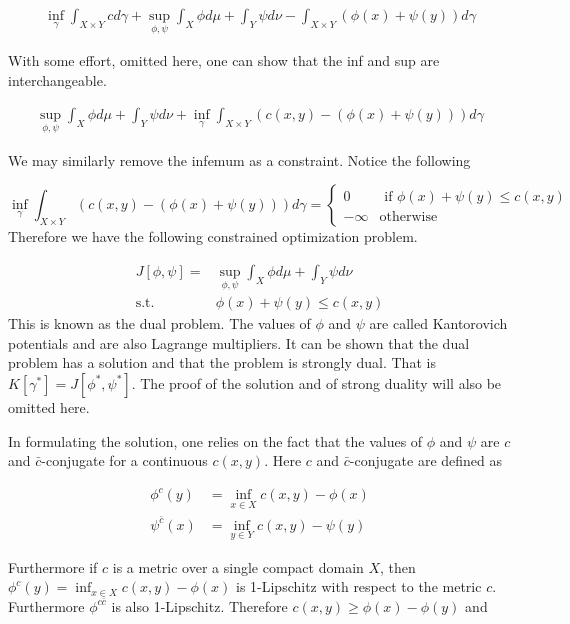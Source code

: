 \documentclass[12pt]{article}
\begin{document}
\begin{align*}
\inf_\gamma \int_{X\times Y} cd\gamma +\sup_{\phi,\psi} \int_X\phi d\mu + \int_Y\psi d\nu - \int_{X\times Y} \left(\phi(x)+\psi(y)\right)d\gamma
\end{align*}

\noindent
With some effort, omitted here, one can show that the inf and sup are interchangeable.

\begin{align*}
\sup_{\phi,\psi} \int_X\phi d\mu + \int_Y\psi d\nu + \inf_\gamma \int_{X\times Y} (c(x,y)-\left(\phi(x)+\psi(y)\right))d\gamma
\end{align*}

\noindent
We may similarly remove the infemum as a constraint. Notice the following

$$\inf_\gamma \int_{X\times Y} (c(x,y)-\left(\phi(x)+\psi(y)\right))d\gamma = \begin{cases} 0 & \text{ if } \phi(x)+\psi(y)\leq c(x,y)\\ -\infty & \text{otherwise} \end{cases}$$
\noindent
Therefore we have the following constrained optimization problem.

\begin{align*}
J[\phi,\psi]=&\sup_{\phi,\psi} \int_X\phi d\mu+\int_Y\psi d\nu \\
\text{s.t.} \quad & \phi(x)+\psi(y)\leq c(x,y)
\end{align*}
\noindent
This is known as the dual problem. The values of $\phi$ and $\psi$ are called Kantorovich potentials and are also Lagrange multipliers. It can be shown that the dual problem has a solution and that the problem is strongly dual. That is $K[\gamma^*]=J[\phi^*,\psi^*]$. The proof of the solution and of strong duality will also be omitted here.

In formulating the solution, one relies on the fact that the values of $\phi$ and $\psi$ are $c$ and $\bar{c}$-conjugate for a continuous $c(x,y)$. Here $c$ and $\bar{c}$-conjugate are defined as

\begin{align*}
\phi^c(y)&=\inf_{x\in X} c(x,y)-\phi(x)\\
\psi^{\bar{c}}(x)&=\inf_{y\in Y} c(x,y)-\psi(y)
\end{align*}

Furthermore if $c$ is a metric over a single compact domain $X$, then $\phi^c(y)=\inf_{x\in X} c(x,y)-\phi(x)$ is 1-Lipschitz with respect to the metric $c$. Furthermore $\phi^{c\bar{c}}$ is also 1-Lipschitz. Therefore $c(x,y)\geq \phi(x)-\phi(y)$ and
\end{document}
